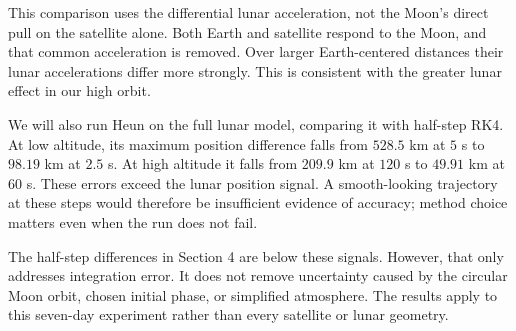 \documentclass[11pt]{article}
\begin{document}
This comparison uses the differential lunar acceleration, not the Moon's direct pull on the satellite alone. Both Earth and satellite respond to the Moon, and that common acceleration is removed. Over larger Earth-centered distances their lunar accelerations differ more strongly. This is consistent with the greater lunar effect in our high orbit.

We will also run Heun on the full lunar model, comparing it with half-step RK4. At low altitude, its maximum position difference falls from $528.5$ km at $5$ s to $98.19$ km at $2.5$ s. At high altitude it falls from $209.9$ km at $120$ s to $49.91$ km at $60$ s. These errors exceed the lunar position signal. A smooth-looking trajectory at these steps would therefore be insufficient evidence of accuracy; method choice matters even when the run does not fail.

The half-step differences in Section 4 are below these signals. However, that only addresses integration error. It does not remove uncertainty caused by the circular Moon orbit, chosen initial phase, or simplified atmosphere. The results apply to this seven-day experiment rather than every satellite or lunar geometry.
\end{document}
